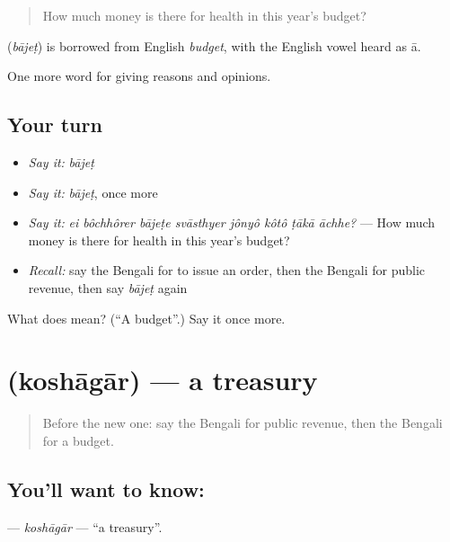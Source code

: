 \begin{quote}
How much money is there for health in this year's budget?
\end{quote}

\begin{cousinweb}
\textbf{} (\emph{bājeṭ}) is borrowed from English \emph{budget}, with the English vowel heard as ā.
\end{cousinweb}

\begin{grammarlens}[title={What you've built}]
One more word for giving reasons and opinions.
\end{grammarlens}

\subsection*{Your turn}
\begin{itemize}
\raggedright
  \item \emph{Say it:} \emph{bājeṭ}
  \item \emph{Say it:} \emph{bājeṭ}, once more
  \item \emph{Say it:} \emph{ei bôchhôrer bājeṭe svāsthyer jônyô kôtô ṭākā āchhe?} — How much money is there for health in this year's budget?
  \item \emph{Recall:} say the Bengali for to issue an order, then the Bengali for public revenue, then say \emph{bājeṭ} again
\end{itemize}

\begin{tcolorbox}[breakable,colback=teal!4,colframe=teal!35!black,title={Before you move on}]
What does  mean? (\textquotedblleft{}A budget\textquotedblright{}.) Say it once more.
\end{tcolorbox}
\section[\texorpdfstring{\bn{কোষাগার} (koshāgār)}{কোষাগার (koshāgār)}]{ (koshāgār) — a treasury}

\label{lesson:BN-C348-koshagar}



\begin{quote}
Before the new one: say the Bengali for public revenue, then the Bengali for a budget.
\end{quote}

\subsection*{You'll want to know: }
\textbf{} — \emph{koshāgār} — \textquotedblleft{}a treasury\textquotedblright{}.

